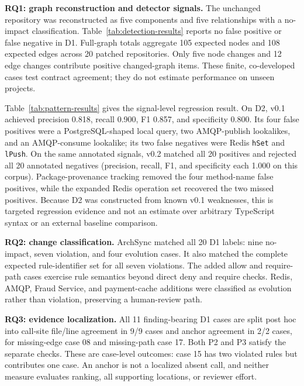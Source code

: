 \documentclass[conference]{IEEEtran}
\begin{document}
\textbf{RQ1: graph reconstruction and detector signals.}
The unchanged repository was reconstructed as five components and five relationships with a no-impact classification. Table~\ref{tab:detection-results} reports no false positive or false negative in D1. Full-graph totals aggregate 105 expected nodes and 108 expected edges across 20 patched repositories. Only five node changes and 12 edge changes contribute positive changed-graph items. These finite, co-developed cases test contract agreement; they do not estimate performance on unseen projects.

Table~\ref{tab:pattern-results} gives the signal-level regression result. On D2, v0.1 achieved precision 0.818, recall 0.900, F1 0.857, and specificity 0.800. Its four false positives were a PostgreSQL-shaped local query, two AMQP-publish lookalikes, and an AMQP-consume lookalike; its two false negatives were Redis \texttt{hSet} and \texttt{lPush}. On the same annotated signals, v0.2 matched all 20 positives and rejected all 20 annotated negatives (precision, recall, F1, and specificity each 1.000 on this corpus). Package-provenance tracking removed the four method-name false positives, while the expanded Redis operation set recovered the two missed positives. Because D2 was constructed from known v0.1 weaknesses, this is targeted regression evidence and not an estimate over arbitrary TypeScript syntax or an external baseline comparison.

\textbf{RQ2: change classification.}
ArchSync matched all 20 D1 labels: nine no-impact, seven violation, and four evolution cases. It also matched the complete expected rule-identifier set for all seven violations. The added allow and require-path cases exercise rule semantics beyond direct deny and require checks. Redis, AMQP, Fraud Service, and payment-cache additions were classified as evolution rather than violation, preserving a human-review path.

\textbf{RQ3: evidence localization.}
All 11 finding-bearing D1 cases are split post hoc into call-site file/line agreement in 9/9 cases and anchor agreement in 2/2 cases, for missing-edge case 08 and missing-path case 17. Both P2 and P3 satisfy the separate checks. These are case-level outcomes: case 15 has two violated rules but contributes one case. An anchor is not a localized absent call, and neither measure evaluates ranking, all supporting locations, or reviewer effort.
\end{document}

